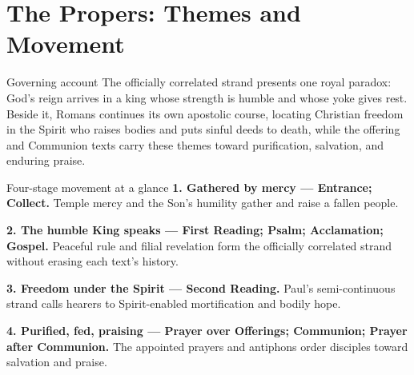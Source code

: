 \begin{deepstudy}
\begin{scripturestable}
\end{scripturestable}

\clearpage

\section*{The Propers: Themes and Movement}

\begin{massbox}{Governing account}
The officially correlated strand presents one royal paradox: God's reign arrives in a king whose strength is humble and whose yoke gives rest. Beside it, Romans continues its own apostolic course, locating Christian freedom in the Spirit who raises bodies and puts sinful deeds to death, while the offering and Communion texts carry these themes toward purification, salvation, and enduring praise.
\end{massbox}

\begin{studybox}{Four-stage movement at a glance}
\textbf{1. Gathered by mercy --- Entrance; Collect.} Temple mercy and the Son's humility gather and raise a fallen people.\par\smallskip
\textbf{2. The humble King speaks --- First Reading; Psalm; Acclamation; Gospel.} Peaceful rule and filial revelation form the officially correlated strand without erasing each text's history.\par\smallskip
\textbf{3. Freedom under the Spirit --- Second Reading.} Paul's semi-continuous strand calls hearers to Spirit-enabled mortification and bodily hope.\par\smallskip
\textbf{4. Purified, fed, praising --- Prayer over Offerings; Communion; Prayer after Communion.} The appointed prayers and antiphons order disciples toward salvation and praise.
\end{studybox}


\end{deepstudy}
